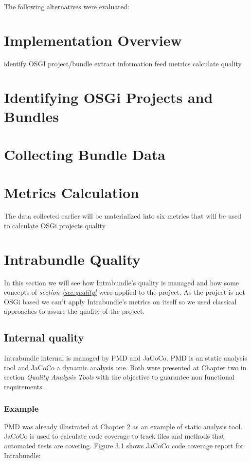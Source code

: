 The following alternatives were evaluated:



\section{Implementation Overview}
identify OSGI project/bundle
extract information
feed metrics
calculate quality

\section{Identifying OSGi Projects and Bundles}

\section{Collecting Bundle Data}

\section{Metrics Calculation}
The data collected earlier will be materialized into six metrics that will be used to calculate OSGi projects quality  

\section{Intrabundle Quality}
In this section we will see how Intrabundle's quality is managed and how some concepts of \textit{section \ref{sec:quality}} were applied to the project. As the project is not OSGi based we can't apply Intrabundle's metrics on itself so we used classical approaches to assure the quality of the project.

\subsection{Internal quality}
Intrabundle internal is managed by PMD and JaCoCo. PMD is an static analysis tool and JaCoCo a dynamic analysis one. Both were presented at Chapter two in section \textit{Quality Analysis Tools} with the objective to guarantee non functional requirements.

\subsubsection{Example}
 PMD was already illustrated at Chapter 2 as an example of static analysis tool. JaCoCo is used to calculate code coverage to track files and methods that automated tests are covering. Figure 3.1 shows JaCoCo code coverage report for Intrabundle:


